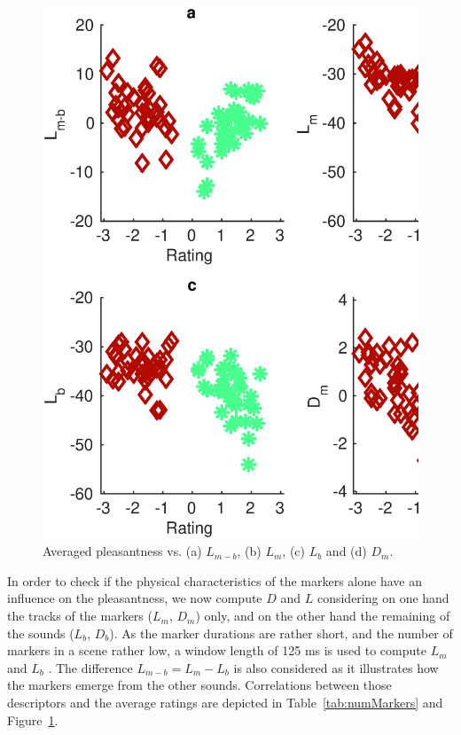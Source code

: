 \documentclass[twoside,twocolumn]{article}
\begin{document}
\begin{figure}[t]
\begin{center}
\includegraphics[width=.4\paperwidth]{../gfxMatlab/xp1_deSoLvMar_1.eps}
  \caption{\label{fig:numMarkers} Averaged pleasantness vs. (a)  $L_{m-b}$, (b) $L_{m}$, (c) $L_{b}$ and (d) $D_m$.}
  \end{center}
\end{figure}

In order to check if the physical characteristics of the markers alone have an influence on the pleasantness, we now compute $D$ and $L$ considering on one hand the tracks of the markers ($L_m$, $D_{m}$) only, and on the other hand the remaining of the sounds ($L_b$, $D_b$). As the marker durations are rather short, and the number of markers in a scene rather low, a window length of 125 ms is used to compute $L_m$ and $L_b$  . The difference $L_{m-b}=L_m-L_b$ is also considered as it illustrates how the markers emerge from the other sounds. Correlations between those descriptors and the average ratings are depicted in Table~\ref{tab:numMarkers} and Figure~\ref{fig:numMarkers}.
\end{document}

